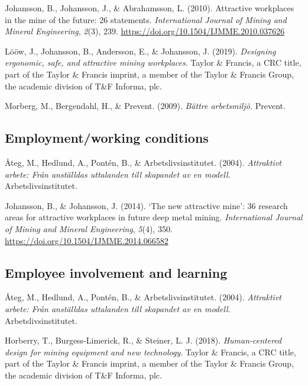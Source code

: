 \documentclass[
  12pt,
]{scrbook}
\begin{document}
Johansson, B., Johansson, J., \& Abrahamsson, L. (2010). Attractive
workplaces in the mine of the future: 26 statements. \emph{International
Journal of Mining and Mineral Engineering}, \emph{2}(3), 239.
\url{https://doi.org/10.1504/IJMME.2010.037626}

Lööw, J., Johansson, B., Andersson, E., \& Johansson, J. (2019).
\emph{Designing ergonomic, safe, and attractive mining workplaces}. Taylor \&
Francis, a CRC title, part of the Taylor \& Francis imprint, a member of
the Taylor \& Francis Group, the academic division of T\&F Informa, plc.

Morberg, M., Bergendahl, H., \& Prevent. (2009). \emph{Bättre arbetsmiljö.}
Prevent.

\hypertarget{employmentworking-conditions-1}{%
\subsection*{Employment/working conditions}\label{employmentworking-conditions-1}}

Åteg, M., Hedlund, A., Pontén, B., \& Arbetslivsinstitutet. (2004).
\emph{Attraktivt arbete: Från anställdas uttalanden till skapandet av en
modell}. Arbetslivsinstitutet.

Johansson, B., \& Johansson, J. (2014). `The new attractive mine': 36
research areas for attractive workplaces in future deep metal mining.
\emph{International Journal of Mining and Mineral Engineering}, \emph{5}(4), 350.
\url{https://doi.org/10.1504/IJMME.2014.066582}

\hypertarget{employee-involvement-and-learning-1}{%
\subsection*{Employee involvement and learning}\label{employee-involvement-and-learning-1}}

Åteg, M., Hedlund, A., Pontén, B., \& Arbetslivsinstitutet. (2004).
\emph{Attraktivt arbete: Från anställdas uttalanden till skapandet av en
modell}. Arbetslivsinstitutet.

Horberry, T., Burgess-Limerick, R., \& Steiner, L. J. (2018).
\emph{Human-centered design for mining equipment and new technology}. Taylor
\& Francis, a CRC title, part of the Taylor \& Francis imprint, a member
of the Taylor \& Francis Group, the academic division of T\&F Informa,
plc.
\end{document}
